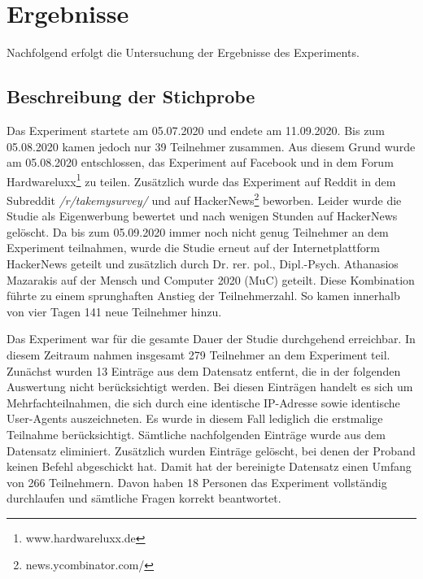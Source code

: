 \section{Ergebnisse}
Nachfolgend erfolgt die Untersuchung der Ergebnisse des Experiments.

\subsection{Beschreibung der Stichprobe}\label{beschreibung}
Das Experiment startete am 05.07.2020 und endete am 11.09.2020. Bis zum 05.08.2020 kamen jedoch nur 39 Teilnehmer zusammen. Aus diesem Grund wurde am 05.08.2020 entschlossen, das Experiment auf Facebook und in dem Forum Hardwareluxx\footnote{www.hardwareluxx.de} zu teilen. Zusätzlich wurde das Experiment auf Reddit in dem Subreddit \textit{/r/takemysurvey/} und auf HackerNews\footnote{news.ycombinator.com/} beworben. Leider wurde die Studie als Eigenwerbung bewertet und nach wenigen Stunden auf HackerNews gelöscht. Da bis zum 05.09.2020 immer noch nicht genug Teilnehmer an dem Experiment teilnahmen, wurde die Studie erneut auf der Internetplattform HackerNews geteilt und zusätzlich durch Dr. rer. pol., Dipl.-Psych. Athanasios Mazarakis auf der Mensch und Computer 2020 (MuC) geteilt. Diese Kombination führte zu einem sprunghaften Anstieg der Teilnehmerzahl. So kamen innerhalb von vier Tagen 141 neue Teilnehmer hinzu.

Das Experiment war für die gesamte Dauer der Studie durchgehend erreichbar. In diesem Zeitraum nahmen insgesamt 279 Teilnehmer an dem Experiment teil. Zunächst wurden 13 Einträge aus dem Datensatz entfernt, die in der folgenden Auswertung nicht berücksichtigt werden. Bei diesen Einträgen handelt es sich um Mehrfachteilnahmen, die sich durch eine identische IP-Adresse sowie identische User-Agents auszeichneten. Es wurde in diesem Fall lediglich die erstmalige Teilnahme berücksichtigt. Sämtliche nachfolgenden Einträge wurde aus dem Datensatz eliminiert. Zusätzlich wurden Einträge gelöscht, bei denen der Proband keinen Befehl abgeschickt hat. Damit hat der bereinigte Datensatz einen Umfang von 266 Teilnehmern. Davon haben 18 Personen das Experiment vollständig durchlaufen und sämtliche Fragen korrekt beantwortet.


